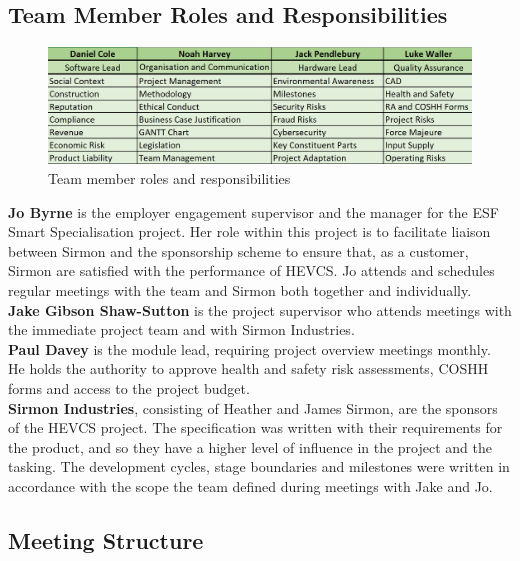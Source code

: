 \documentclass [12pt]{article}
\begin{document}
\subsection{Team Member Roles and Responsibilities}\label{sec:Team_Member_Roles_and_Responsibilities}

\begin{figure}[H]
\centerline{\includegraphics[width=1\textwidth]{TeamRoles.png}}
\caption{Team member roles and responsibilities}
\label{fig:figure_1}
\end{figure}

\textbf{Jo Byrne} is the employer engagement supervisor and the manager for the ESF Smart Specialisation project. Her role within this project is to facilitate liaison between Sirmon and the sponsorship scheme to ensure that, as a customer, Sirmon are satisfied with the performance of HEVCS. Jo attends and schedules regular meetings with the team and Sirmon both together and individually.
\\
\textbf{Jake Gibson Shaw-Sutton} is the project supervisor who attends meetings with the immediate project team and with Sirmon Industries.
\\
\textbf{Paul Davey} is the module lead, requiring project overview meetings monthly. He holds the authority to approve health and safety risk assessments, COSHH forms and access to the project budget.
\\
\textbf{Sirmon Industries}, consisting of Heather and James Sirmon, are the sponsors of the HEVCS project. The specification was written with their requirements for the product, and so they have a higher level of influence in the project and the tasking. The development cycles, stage boundaries and milestones were written in accordance with the scope the team defined during meetings with Jake and Jo.

\subsection{Meeting Structure}\label{sec:Meeting_Structure}
\end{document}

